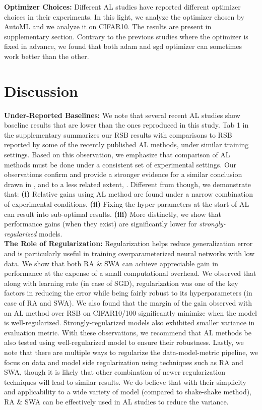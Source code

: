 \documentclass[10pt,twocolumn,letterpaper]{article}
\begin{document}
\noindent \textbf{Optimizer Choices:} Different AL studies have reported different optimizer choices in their experiments. In this light, we analyze the optimizer chosen by AutoML and we analyze it on CIFAR10. The results are present in supplementary section. Contrary to the previous studies where the optimizer is fixed in advance, we found that both adam and sgd optimizer can sometimes work better than the other.


\section{Discussion}

\noindent \textbf{Under-Reported Baselines:} We note that several recent AL studies show baseline results that are lower than the ones reproduced in this study. Tab 1 in the supplementary summarizes our RSB results with comparisons to RSB reported by some of the recently published AL methods, under similar training settings. Based on this observation, we emphasize that comparison of AL methods must be done under a consistent set of experimental settings. Our observations confirm and provide a stronger evidence for a similar conclusion drawn in \cite{mittal2019parting}, and to a less related extent, \cite{oliver2018realistic_ssl}. Different from \cite{mittal2019parting} though, we demonstrate that: \textbf{(i)} Relative gains using AL method are found under a narrow combination of experimental conditions. \textbf{(ii)} Fixing the hyper-parameters at the start of AL can result into sub-optimal results. \textbf{(iii)} More distinctly, we show that performance gains (when they exist) are significantly lower for \textit{strongly-regularized} models.\\


\noindent \textbf{The Role of Regularization:} Regularization helps reduce generalization error and is particularly useful in training overparameterized neural networks with low data. We show that both RA \& SWA can achieve appreciable gain in performance at the expense of a small computational overhead. We observed that along with learning rate (in case of SGD), regularization was one of the key factors in reducing the error while being fairly robust to its hyperparameters (in case of RA and SWA). We also found that the margin of the gain observed with an AL method over RSB on CIFAR10/100 significantly minimize when the model is well-regularized. Strongly-regularized models also exhibited smaller variance in evaluation metric. With these observations, we recommend that AL methods be also tested using well-regularized model to ensure their robustness. Lastly, we note that there are multiple ways to regularize the data-model-metric pipeline, we focus on data and model side regularization using techniques such as RA and SWA, though it is likely that other combination of newer regularization techniques will lead to similar results. We do believe that with their simplicity and applicability to a wide variety of model (compared to shake-shake method), RA \& SWA can be effectively used in AL studies to reduce the variance.\\
\end{document}
